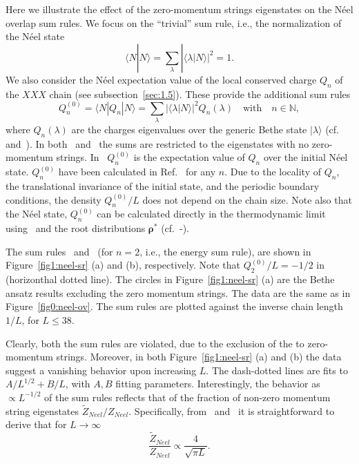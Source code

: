 \documentclass[11pt]{iopart}
\begin{document}
Here we illustrate the effect of the zero-momentum strings eigenstates on the 
N\'eel overlap sum rules. We focus on the ``trivial'' sum rule, i.e., the 
normalization of the N\'eel state  
%
\begin{equation}
\label{sr-trivial}
\langle N|N\rangle=\sum\limits_{\lambda}|\langle\lambda|N\rangle|^2=1. 
\end{equation}
%
We also consider the N\'eel expectation value of the local conserved charge 
$Q_n$ of the $XXX$ chain (see subsection~\ref{sec:1.5}). These provide the 
additional sum rules
%
\begin{equation}
\label{sr-charge}
Q_n^{(0)}=\langle N|Q_n|N\rangle=\sum\limits_{\lambda}|\langle\lambda|N\rangle|^2
Q_{n}(\lambda)\quad\textrm{with}\quad n\in\mathbb{N}, 
\end{equation}
%
where $Q_n(\lambda)$ are the charges eigenvalues over the generic Bethe state 
$|\lambda\rangle$ (cf.~ and~). In both~ 
and~ the sums are restricted to the eigenstates with no zero-momentum 
strings. In~ $Q_n^{(0)}$ is the expectation value of $Q_n$ over the 
initial N\'eel state. $Q_n^{(0)}$ have been calculated in Ref.~\cite{fagotti-2013} 
for any $n$. Due to the locality of $Q_n$, the translational invariance of the initial 
state, and the periodic boundary conditions, the density $Q_n^{(0)}/L$ does 
not depend on the chain size. Note also that the N\'eel state, $Q_n^{(0)}$ can be 
calculated directly in the thermodynamic limit using~ and the root 
distributions $\pmb{\rho}^*$ (cf.~-). 

The sum rules~ and~ (for $n=2$, i.e., the energy 
sum rule), are shown in Figure~\ref{fig1:neel-sr} (a) and (b), respectively. 
Note that $Q^{(0)}_2/L=-1/2$ in~ (horizonthal dotted line). 
The circles in Figure~\ref{fig1:neel-sr} (a) are the Bethe ansatz results excluding 
the zero momentum strings. The data are the same as in Figure~\ref{fig0:neel-ov}. 
The sum rules are plotted against the inverse chain length $1/L$, for $L\le 38$. 

Clearly, both the sum rules are violated, due to the exclusion of the to zero-momentum 
strings. Moreover, in both Figure~\ref{fig1:neel-sr} (a) and (b) the data suggest a 
vanishing behavior upon increasing $L$. The dash-dotted lines are fits to  $A/L^{1/2}
+B/L$, with $A,B$ fitting parameters. Interestingly, the behavior as $\propto 
L^{-1/2}$ of the sum rules reflects that of the fraction of non-zero momentum string 
eigenstates $\widetilde Z_{Neel}/Z_{Neel}$. Specifically, from~ and~ 
it is straightforward to derive that for $L\to\infty$
%
\begin{equation}
\label{beh}
\frac{\widetilde Z_{Neel}}{Z_{Neel}}\propto\frac{4}{\sqrt{\pi L}}. 
\end{equation}
% 
\end{document}

